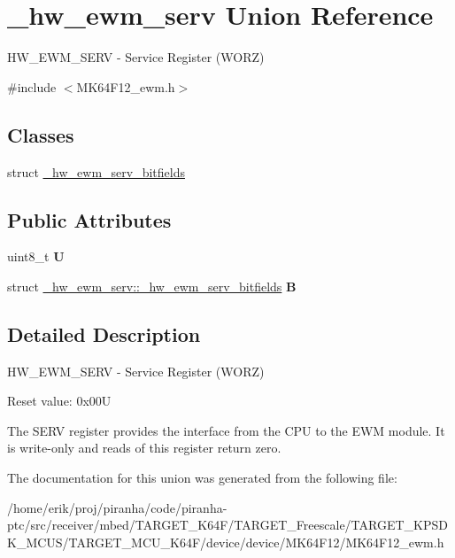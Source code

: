 \hypertarget{union__hw__ewm__serv}{}\section{\+\_\+hw\+\_\+ewm\+\_\+serv Union Reference}
\label{union__hw__ewm__serv}


H\+W\+\_\+\+E\+W\+M\+\_\+\+S\+E\+RV -\/ Service Register (W\+O\+RZ)  




{\ttfamily \#include $<$M\+K64\+F12\+\_\+ewm.\+h$>$}

\subsection*{Classes}
\begin{DoxyCompactItemize}
\item 
struct \hyperlink{struct__hw__ewm__serv_1_1__hw__ewm__serv__bitfields}{\+\_\+hw\+\_\+ewm\+\_\+serv\+\_\+bitfields}
\end{DoxyCompactItemize}
\subsection*{Public Attributes}
\begin{DoxyCompactItemize}
\item 
uint8\+\_\+t {\bfseries U}\hypertarget{union__hw__ewm__serv_aab234e49cabc5b830213b6ed223b430b}{}\label{union__hw__ewm__serv_aab234e49cabc5b830213b6ed223b430b}

\item 
struct \hyperlink{struct__hw__ewm__serv_1_1__hw__ewm__serv__bitfields}{\+\_\+hw\+\_\+ewm\+\_\+serv\+::\+\_\+hw\+\_\+ewm\+\_\+serv\+\_\+bitfields} {\bfseries B}\hypertarget{union__hw__ewm__serv_ac414e51802d728f263bf71c93ce31b5d}{}\label{union__hw__ewm__serv_ac414e51802d728f263bf71c93ce31b5d}

\end{DoxyCompactItemize}


\subsection{Detailed Description}
H\+W\+\_\+\+E\+W\+M\+\_\+\+S\+E\+RV -\/ Service Register (W\+O\+RZ) 

Reset value\+: 0x00U

The S\+E\+RV register provides the interface from the C\+PU to the E\+WM module. It is write-\/only and reads of this register return zero. 

The documentation for this union was generated from the following file\+:\begin{DoxyCompactItemize}
\item 
/home/erik/proj/piranha/code/piranha-\/ptc/src/receiver/mbed/\+T\+A\+R\+G\+E\+T\+\_\+\+K64\+F/\+T\+A\+R\+G\+E\+T\+\_\+\+Freescale/\+T\+A\+R\+G\+E\+T\+\_\+\+K\+P\+S\+D\+K\+\_\+\+M\+C\+U\+S/\+T\+A\+R\+G\+E\+T\+\_\+\+M\+C\+U\+\_\+\+K64\+F/device/device/\+M\+K64\+F12/M\+K64\+F12\+\_\+ewm.\+h\end{DoxyCompactItemize}
